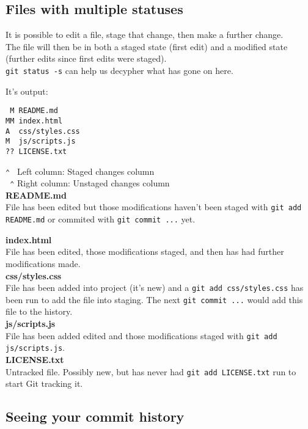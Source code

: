 \subsection{Files with multiple statuses}

It is possible to edit a file, stage that change, then make a further change.
\\

The file will then be in both a staged state (first edit) and a modified state (further edits since first edits were staged).
\\

\texttt{git status -s} can help us decypher what has gone on here.

It's output:

\begin{verbatim}
 M README.md
MM index.html
A  css/styles.css
M  js/scripts.js
?? LICENSE.txt
\end{verbatim}

\texttt{⌃ } Left column: Staged changes column
\\
\texttt{ ⌃} Right column: Unstaged changes column
\\

\textbf{README.md}
\\
File has been edited but those modifications haven't been staged with \texttt{git add README.md} or commited with \texttt{git commit ...} yet.


\textbf{index.html}
\\
File has been edited, those modifications staged, and then has had further modifications made.
\\

\textbf{css/styles.css}
\\
File has been added into project (it's new) and a \texttt{git add css/styles.css} has been run to add the file into staging. The next \texttt{git commit ...} would add this file to the history.
\\

\textbf{js/scripts.js}
\\
File has been added edited and those modifications staged with \texttt{git add js/scripts.js}.
\\

\textbf{LICENSE.txt}
\\
Untracked file. Possibly new, but has never had \texttt{git add LICENSE.txt} run to start Git tracking it.
\\

\subsection{Seeing your commit history}

